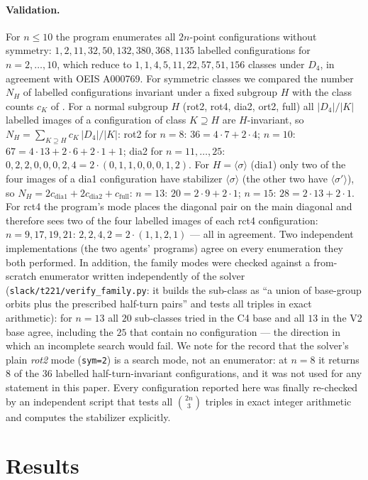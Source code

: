 \documentclass[11pt]{article}
\theoremstyle{remark}
\newcommand{\Dfour}{D_4}
\begin{document}
\paragraph{Validation.}
For $n\le 10$ the program enumerates all $2n$-point configurations without symmetry: $1,2,11,32,50,132,380,368,1135$ labelled
configurations for $n=2,\dots,10$, which reduce to $1,1,4,5,11,22,57,51,156$ classes under $\Dfour$, in agreement with OEIS
A000769.  For symmetric classes we compared the number $N_H$ of labelled configurations invariant under a fixed subgroup $H$
with the class counts $c_K$ of \cite{FlammenkampDB}.  For a normal subgroup $H$ (rot2, rot4, dia2, ort2, full) all
$|\Dfour|/|K|$ labelled images of a configuration of class $K\supseteq H$ are $H$-invariant, so $N_H=\sum_{K\supseteq H}
c_K\,|\Dfour|/|K|$: rot2 for $n=8$: $36=4\cdot7+2\cdot4$; $n=10$: $67=4\cdot13+2\cdot6+2\cdot1+1$; dia2 for
$n=11,\dots,25$: $0,2,2,0,0,0,2,4=2\cdot(0,1,1,0,0,0,1,2)$.  For $H=\langle\sigma\rangle$ (dia1) only two of the four
images of a dia1 configuration have stabilizer $\langle\sigma\rangle$ (the other two have $\langle\sigma'\rangle$), so
$N_H=2c_{\mathrm{dia1}}+2c_{\mathrm{dia2}}+c_{\mathrm{full}}$: $n=13$: $20=2\cdot9+2\cdot1$; $n=15$: $28=2\cdot13+2\cdot1$.
For rct4 the program's mode places the diagonal pair on the main diagonal and therefore sees two of the four labelled images
of each rct4 configuration: $n=9,17,19,21$: $2,2,4,2=2\cdot(1,1,2,1)$ --- all in agreement.  Two independent
implementations (the two agents' programs) agree on every enumeration they both performed.  In addition, the family modes were checked
against a from-scratch enumerator written independently of the solver (\texttt{slack/t221/verify\_family.py}: it builds the sub-class as
``a union of base-group orbits plus the prescribed half-turn pairs'' and tests all triples in exact arithmetic): for $n=13$ all $20$
sub-classes tried in the C4 base and all $13$ in the V2 base agree, including the $25$ that contain no configuration --- the direction in
which an incomplete search would fail.  We note for the record that the solver's plain \emph{rot2} mode (\texttt{sym=2}) is a search mode,
not an enumerator: at $n=8$ it returns $8$ of the $36$ labelled half-turn-invariant configurations, and it was not used for any statement
in this paper.  Every configuration reported here
was finally re-checked by an independent script that tests all $\binom{2n}{3}$ triples in exact integer arithmetic and
computes the stabilizer explicitly.

\section{Results}\label{sec:results}
\end{document}
